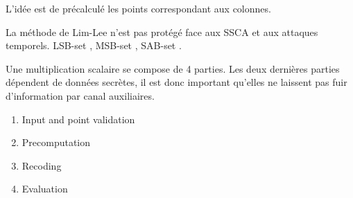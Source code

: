 L'idée est de précalculé les points correspondant aux colonnes.


La méthode de Lim-Lee n'est pas protégé face aux SSCA et aux attaques temporels. LSB-set \cite{feng2005efficient}, MSB-set \cite{feng2006signed}, SAB-set \cite{hedabou2005countermeasures}.





Une multiplication scalaire se compose de 4 parties. Les deux dernières parties dépendent de données secrètes, il est donc important qu'elles ne laissent pas fuir d'information par canal auxiliaires.
\begin{enumerate}
    \item Input and point validation
    \item Precomputation
    \item Recoding
    \item Evaluation
\end{enumerate}
